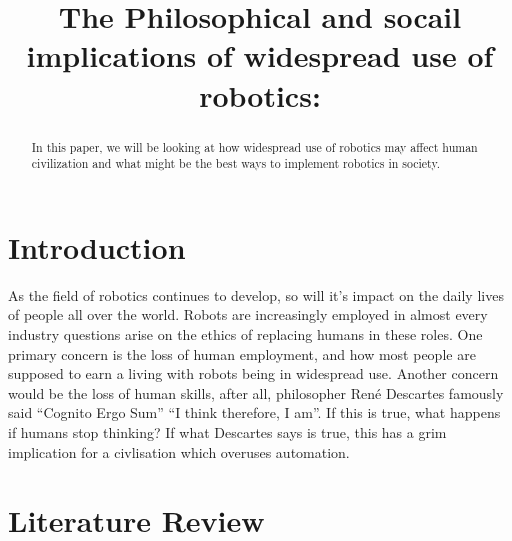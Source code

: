 \documentclass[conference]{IEEEtran}
\begin{document}
\title{The Philosophical and socail implications of widespread use of robotics:
}

\author{
}

\maketitle

\begin{abstract}
In this paper, we will be looking at how widespread use of robotics may affect human civilization and what might be the best ways to implement robotics in society.
\end{abstract}



\section{Introduction}
As the field of robotics continues to develop, so will it's impact on the daily lives of people all over the world.
Robots are increasingly employed in almost every industry questions arise on the ethics of replacing humans in these roles. One primary concern is the loss of human employment, and how most people are supposed to earn a living with robots being in widespread use. Another concern would be the loss of human skills, after all, philosopher René Descartes famously said ``Cognito Ergo Sum'' ``I think therefore, I am''. If this is true, what happens if humans stop thinking? If what Descartes says is true, this has a grim implication for a civlisation which overuses automation.


\section{Literature Review}
%
%

\printbibliography

\vspace{12pt}
\color{red}
\end{document}
